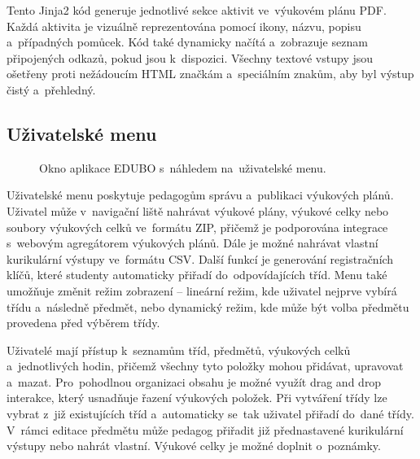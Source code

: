 \documentclass[male,czech,api_bc]{kitheses}
\begin{document}
Tento Jinja2 kód generuje jednotlivé sekce aktivit ve~výukovém plánu PDF. Každá aktivita je vizuálně reprezentována pomocí ikony, názvu, popisu a~případných pomůcek. Kód také dynamicky načítá a~zobrazuje seznam připojených odkazů, pokud jsou k~dispozici. Všechny textové vstupy jsou ošetřeny proti nežádoucím HTML značkám a~speciálním znakům, aby byl výstup čistý a~přehledný.

\subsection{Uživatelské menu}

\begin{figure}[H]
	\centering
	\caption{Okno aplikace EDUBO s~náhledem na~uživatelské menu.}
	\label{fig:edubo-4}
\end{figure}

Uživatelské menu poskytuje pedagogům správu a~publikaci výukových plánů. Uživatel může v~navigační liště nahrávat výukové plány, výukové celky nebo soubory výukových celků ve~formátu ZIP, přičemž je podporována integrace s~webovým agregátorem výukových plánů. Dále je možné nahrávat vlastní kurikulární výstupy ve~formátu CSV. Další funkcí je generování registračních klíčů, které studenty automaticky přiřadí do~odpovídajících tříd. Menu také umožňuje změnit režim zobrazení – lineární režim, kde uživatel nejprve vybírá třídu a~následně předmět, nebo dynamický režim, kde může být volba předmětu provedena před výběrem třídy.

Uživatelé mají přístup k~seznamům tříd, předmětů, výukových celků a~jednotlivých hodin, přičemž všechny tyto položky mohou přidávat, upravovat a~mazat. Pro~pohodlnou organizaci obsahu je možné využít drag and drop interakce, který usnadňuje řazení výukových položek. Při vytváření třídy lze vybrat z~již existujících tříd a~automaticky se~tak uživatel přiřadí do~dané třídy. V~rámci editace předmětu může pedagog přiřadit již přednastavené kurikulární výstupy nebo nahrát vlastní. Výukové celky je možné doplnit o~poznámky.
\end{document}
